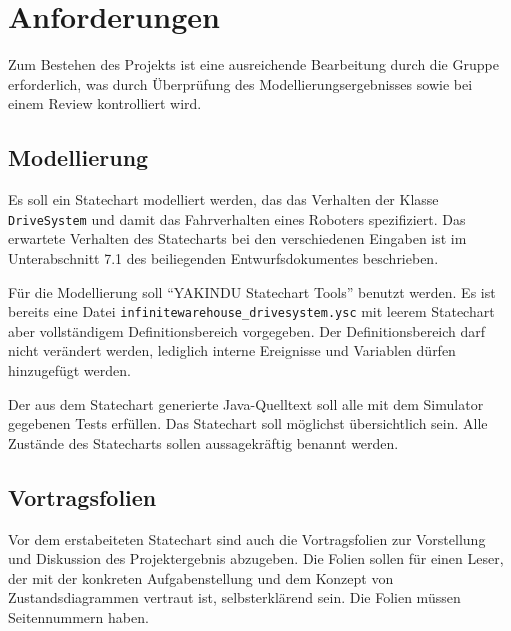 
\section{Anforderungen}
\label{sec:teile}

Zum Bestehen des Projekts ist eine ausreichende Bearbeitung durch die Gruppe erforderlich,
was durch Überprüfung des Modellierungsergebnisses sowie bei einem Review kontrolliert wird.




\subsection{Modellierung}
\label{subsec:mod}

Es soll ein Statechart modelliert werden, das das Verhalten der Klasse \texttt{DriveSystem} und damit das Fahrverhalten eines Roboters spezifiziert. 
Das erwartete Verhalten des Statecharts bei den verschiedenen Eingaben ist im Unterabschnitt 7.1 des beiliegenden Entwurfsdokumentes beschrieben.

Für die Modellierung soll \enquote{YAKINDU Statechart Tools} benutzt werden. 
Es ist bereits eine Datei \texttt{infinitewarehouse\_drivesystem.ysc} mit leerem Statechart aber vollständigem Definitionsbereich vorgegeben. 
Der Definitionsbereich darf nicht verändert werden, lediglich interne Ereignisse und Variablen dürfen hinzugefügt werden. 

Der aus dem Statechart generierte Java-Quelltext soll alle mit dem Simulator gegebenen Tests erfüllen. 
Das Statechart soll möglichst übersichtlich sein. 
Alle Zustände des Statecharts sollen aussagekräftig benannt werden.





\subsection{Vortragsfolien}

Vor dem erstabeiteten Statechart sind auch die Vortragsfolien zur Vorstellung und Diskussion des Projektergebnis abzugeben.
Die Folien sollen für einen Leser, der mit der konkreten Aufgabenstellung und dem Konzept von Zustandsdiagrammen vertraut ist, selbsterklärend sein.
Die Folien müssen Seitennummern haben.

